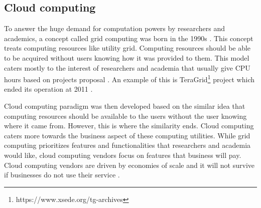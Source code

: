 %



\subsection{Cloud computing}


To answer the huge demand for computation powers by researchers and academics,  a concept called grid computing was born in the 1990s \citep{berman2003grid, foster2003grid}. This concept treats computing resources like utility grid. Computing resources should be able to be acquired without users knowing how it was provided to them. This model caters mostly to the interest of researchers and academia that usually give CPU hours based on projects proposal \citep{foster2008cloud}. An example of this is TeraGrid\footnote{https://www.xsede.org/tg-archives} project which ended its operation at 2011 .

Cloud computing paradigm was then developed based on the similar idea that computing resources should be available to the users without the user knowing where it came from. However, this is where the similarity ends. Cloud computing caters more towards the business aspect of these computing utilities. While grid computing prioritizes features and functionalities that researchers and academia would like, cloud computing vendors focus on features that business will pay. Cloud computing vendors are driven by economies of scale and it will not survive if businesses do not use their service \citep{foster2008cloud}.

